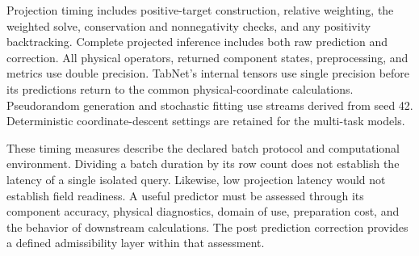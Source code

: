 Projection timing includes positive-target construction, relative weighting, the weighted solve, conservation and nonnegativity checks, and any positivity backtracking. Complete projected inference includes both raw prediction and correction. All physical operators, returned component states, preprocessing, and metrics use double precision. TabNet's internal tensors use single precision before its predictions return to the common physical-coordinate calculations. Pseudorandom generation and stochastic fitting use streams derived from seed 42. Deterministic coordinate-descent settings are retained for the multi-task models.

These timing measures describe the declared batch protocol and computational environment. Dividing a batch duration by its row count does not establish the latency of a single isolated query. Likewise, low projection latency would not establish field readiness. A useful predictor must be assessed through its component accuracy, physical diagnostics, domain of use, preparation cost, and the behavior of downstream calculations. The post prediction correction provides a defined admissibility layer within that assessment.
